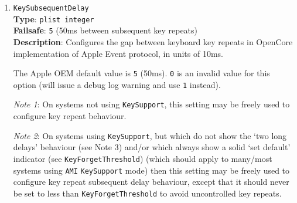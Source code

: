 \documentclass[]{article}
\begin{document}
\begin{enumerate}
\item
  \texttt{KeySubsequentDelay}\\
  \textbf{Type}: \texttt{plist\ integer}\\
  \textbf{Failsafe}: \texttt{5} (50ms between subsequent key repeats)\\
  \textbf{Description}: Configures the gap between keyboard key repeats in OpenCore implementation
  of Apple Event protocol, in units of 10ms.

  The Apple OEM default value is \texttt{5} (50ms).
  \texttt{0} is an invalid value for this option (will issue a debug log warning and use \texttt{1} instead).

  \emph{Note 1}: On systems not using \texttt{KeySupport}, this setting may be freely used
  to configure key repeat behaviour.

  \emph{Note 2}: On systems using \texttt{KeySupport}, but which do not show the `two long
  delays' behaviour (see Note 3) and/or which always show a solid `set default' indicator
  (see \texttt{KeyForgetThreshold}) (which should apply to many/most systems using \texttt{AMI}
  \texttt{KeySupport} mode) then this setting may be freely used to configure key repeat
  subsequent delay behaviour, except that it should never be set to less than \texttt{KeyForgetThreshold}
  to avoid uncontrolled key repeats.


\end{enumerate}
\end{document}
